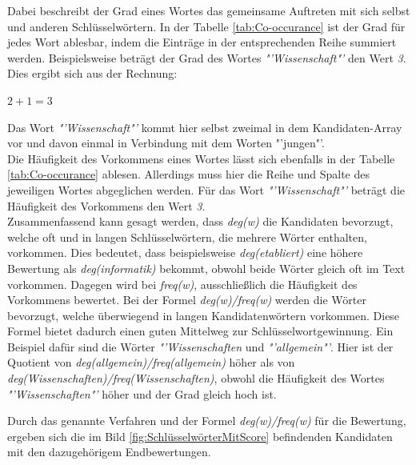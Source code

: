 			Dabei beschreibt der Grad eines Wortes das gemeinsame Auftreten mit sich selbst und anderen Schlüsselwörtern. In der Tabelle \ref{tab:Co-occurance} ist der Grad für jedes Wort ablesbar, indem die Einträge in der entsprechenden Reihe summiert werden. Beispielsweise beträgt der Grad des Wortes \textit{"'Wissenschaft"'} den Wert \textit{3}. Dies ergibt sich aus der Rechnung:
			\begin{center}
				$2 + 1 = 3$
			\end{center}
			Das Wort \textit{"'Wissenschaft"'} kommt hier selbst zweimal in dem Kandidaten-Array vor und davon einmal in Verbindung mit dem Worten "'jungen"'.\\
			Die Häufigkeit des Vorkommens eines Wortes lässt sich ebenfalls in der Tabelle \ref{tab:Co-occurance} ablesen. Allerdings muss hier die Reihe und Spalte des jeweiligen Wortes abgeglichen werden. Für das Wort \textit{"'Wissenschaft"'} beträgt die Häufigkeit des Vorkommens den Wert \textit{3}.\\
			Zusammenfassend kann gesagt werden, dass \textit{deg(w)} die Kandidaten bevorzugt, welche oft und in langen Schlüsselwörtern, die mehrere Wörter enthalten, vorkommen. Dies bedeutet, dass beispielsweise \textit{deg(etabliert)} eine höhere Bewertung als \textit{deg(informatik)} bekommt, obwohl beide Wörter gleich oft im Text vorkommen. Dagegen wird bei \textit{freq(w)}, ausschließlich die Häufigkeit des Vorkommens bewertet. Bei der Formel \textit{deg(w)/freq(w)} werden die Wörter bevorzugt, welche überwiegend in langen Kandidatenwörtern vorkommen. Diese Formel bietet dadurch einen guten Mittelweg zur Schlüsselwortgewinnung. Ein Beispiel dafür sind die Wörter \textit{"'Wissenschaften} und \textit{"'allgemein"'}. Hier ist der Quotient von \textit{deg(allgemein)/freq(allgemein)} höher als von \textit{deg(Wissenschaften)/freq(Wissenschaften)}, obwohl die Häufigkeit des Wortes \textit{"'Wissenschaften"'} höher und der Grad gleich hoch ist. \cite{rose2010automatic}
			
			Durch das genannte Verfahren und der Formel \textit{deg(w)/freq(w)} für die Bewertung, ergeben sich die im Bild \ref{fig:SchlüsselwörterMitScore} befindenden Kandidaten mit den dazugehörigem Endbewertungen. \cite{rose2010automatic}
			
